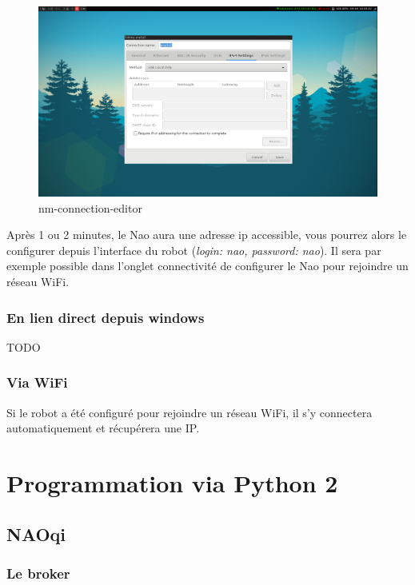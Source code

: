 \documentclass{article}
\begin{document}
\begin{figure}[h]
	\begin{center}
			\includegraphics[scale=0.2]{img/nm-connection-editor}
		\caption{nm-connection-editor}
		\label{fig:nm-connection-editor}
	\end{center}
\end{figure}

Après 1 ou 2 minutes, le Nao aura une adresse ip accessible, vous pourrez alors le configurer depuis l'interface du robot (\emph{login: nao, password: nao}). Il sera par exemple possible dans l'onglet connectivité de configurer le Nao pour rejoindre un réseau WiFi.

\subsubsection{En lien direct depuis windows}

TODO

\subsubsection{Via WiFi}

Si le robot a été configuré pour rejoindre un réseau WiFi, il s'y connectera automatiquement et récupérera une IP.

\section{Programmation via Python 2}

\subsection{NAOqi}

\subsubsection{Le broker}
\end{document}
